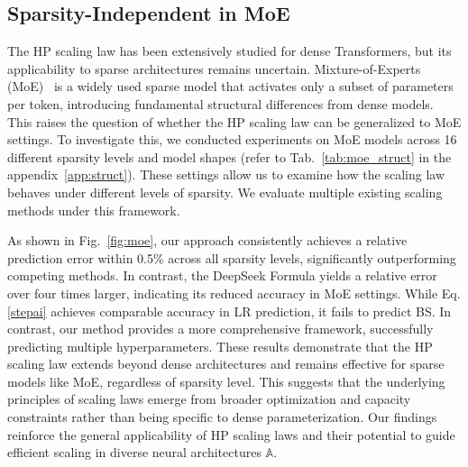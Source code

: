 \documentclass[11pt]{article}
\begin{document}
    \subsection{Sparsity-Independent in MoE}
    \label{sec:moe}


    The HP scaling law has been extensively studied for dense Transformers, but its applicability to sparse architectures remains uncertain. Mixture-of-Experts (MoE)~\cite{shazeer2017outrageously,fedus2022switch} is a widely used sparse model that activates only a subset of parameters per token, introducing fundamental structural differences from dense models. This raises the question of whether the HP scaling law can be generalized to MoE settings. To investigate this, we conducted experiments on MoE models across 16 different sparsity levels and model shapes (refer to Tab.~\ref{tab:moe_struct} in the appendix~\ref{app:struct}). These settings allow us to examine how the scaling law behaves under different levels of sparsity. We evaluate multiple existing scaling methods under this framework. 

    As shown in Fig.~\ref{fig:moe}, our approach consistently achieves a relative prediction error within 0.5\% across all sparsity levels, significantly outperforming competing methods. In contrast, the DeepSeek Formula yields a relative error over four times larger, indicating its reduced accuracy in MoE settings. While Eq.\eqref{stepai} achieves comparable accuracy in LR prediction, it fails to predict BS. In contrast, our method provides a more comprehensive framework, successfully predicting multiple hyperparameters. These results demonstrate that the HP scaling law extends beyond dense architectures and remains effective for sparse models like MoE, regardless of sparsity level. This suggests that the underlying principles of scaling laws emerge from broader optimization and capacity constraints rather than being specific to dense parameterization. Our findings reinforce the general applicability of HP scaling laws and their potential to guide efficient scaling in diverse neural architectures $\mathbb{A}$.
\end{document}
